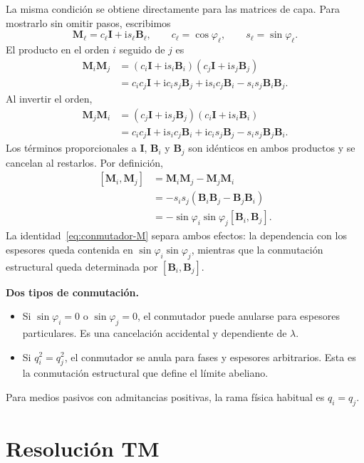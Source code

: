 \documentclass[10pt,a4paper]{article}
\newcommand{\ii}{\mathrm{i}}
\newcommand{\M}{\mathbf{M}}
\newcommand{\B}{\mathbf{B}}
\newcommand{\I}{\mathbf{I}}
\newcommand{\comm}[2]{\left[#1,#2\right]}
\begin{document}
La misma condici\'on se obtiene directamente para las matrices de capa. Para mostrarlo sin omitir pasos, escribimos
\begin{equation*}
\M_\ell=c_\ell\I+\ii s_\ell\B_\ell,
\qquad
c_\ell=\cos\varphi_\ell,
\qquad
s_\ell=\sin\varphi_\ell.
\end{equation*}
El producto en el orden $i$ seguido de $j$ es
\begin{align*}
\M_i\M_j
&=(c_i\I+\ii s_i\B_i)(c_j\I+\ii s_j\B_j)
\\
&=c_ic_j\I+\ii c_is_j\B_j+\ii s_ic_j\B_i-s_is_j\B_i\B_j.
\end{align*}
Al invertir el orden,
\begin{align*}
\M_j\M_i
&=(c_j\I+\ii s_j\B_j)(c_i\I+\ii s_i\B_i)
\\
&=c_ic_j\I+\ii s_ic_j\B_i+\ii c_is_j\B_j-s_is_j\B_j\B_i.
\end{align*}
Los t\'erminos proporcionales a $\I$, $\B_i$ y $\B_j$ son id\'enticos en ambos productos y se cancelan al restarlos. Por definici\'on,
\begin{align}
\comm{\M_i}{\M_j}
&=\M_i\M_j-\M_j\M_i
\nonumber\\
&=-s_is_j\left(\B_i\B_j-\B_j\B_i\right)
\nonumber\\
&=-\sin\varphi_i\sin\varphi_j\comm{\B_i}{\B_j}.
\label{eq:conmutador-M}
\end{align}
La identidad~\eqref{eq:conmutador-M} separa ambos efectos: la dependencia con los espesores queda contenida en $\sin\varphi_i\sin\varphi_j$, mientras que la conmutaci\'on estructural queda determinada por $\comm{\B_i}{\B_j}$.

\begin{warningbox}
\textbf{Dos tipos de conmutaci\'on.}
\begin{itemize}
\item Si $\sin\varphi_i=0$ o $\sin\varphi_j=0$, el conmutador puede anularse para espesores particulares. Es una cancelaci\'on accidental y dependiente de $\lambda$.
\item Si $q_i^2=q_j^2$, el conmutador se anula para fases y espesores arbitrarios. Esta es la conmutaci\'on estructural que define el l\'imite abeliano.
\end{itemize}
\end{warningbox}

Para medios pasivos con admitancias positivas, la rama f\'isica habitual es $q_i=q_j$.

\section{Resoluci\'on TM}
\end{document}
